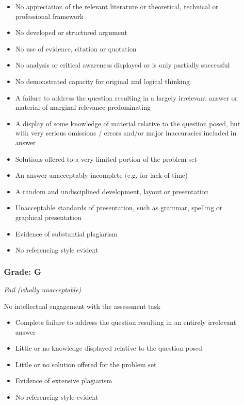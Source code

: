 \documentclass[12pt,a4paper]{article}
\begin{document}
\begin{itemize}
	\item No appreciation of the relevant literature or theoretical, technical or professional framework
	\item No developed or structured argument
	\item No use of evidence, citation or quotation
	\item No analysis or critical awareness displayed or is only partially successful
	\item No demonstrated capacity for original and logical thinking
	\item A failure to address the question resulting in a largely irrelevant answer or material of marginal relevance predominating
	\item A display of some knowledge of material relative to the question posed, but with very serious omissions / errors and/or major inaccuracies included in answer
	\item Solutions offered to a very limited portion of the problem set
	\item An answer unacceptably incomplete (e.g. for lack of time)
	\item A random and undisciplined development, layout or presentation
	\item Unacceptable standards of presentation, such as grammar, spelling or graphical presentation
	\item Evidence of substantial plagiarism
	\item No referencing style evident
\end{itemize}

\subsubsection*{Grade: G}

\textit{Fail (wholly unacceptable)}

No intellectual engagement with the assessment task

\begin{itemize}
	\item Complete failure to address the question resulting in an entirely irrelevant answer
	\item Little or no knowledge displayed relative to the question posed
	\item Little or no solution offered for the problem set
	\item Evidence of extensive plagiarism
	\item No referencing style evident
\end{itemize}
\end{document}
